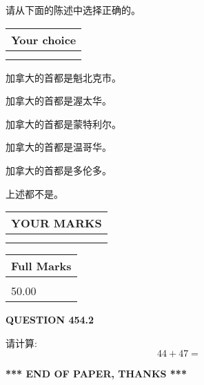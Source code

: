 \documentclass{ctexart}
\begin{document}
  
请从下面的陈述中选择正确的。
  
  
\noindent\hspace{3.0in} \begin{tabular}{|l|}
\hline
Your choice \\
\hline
 \\ 
 \\ 
\hline
\end{tabular}
  
  
 
 
加拿大的首都是魁北克市。
 
 
加拿大的首都是渥太华。
 
 
加拿大的首都是蒙特利尔。
 
 
加拿大的首都是温哥华。
 
 
加拿大的首都是多伦多。
 
 
 上述都不是。
 
 
  
\vspace{0.2in}
  
\noindent\begin{tabular}{|l|}
\hline
 YOUR MARKS  \\
\hline
 \\ 
 \\ 
\hline
\end{tabular}
\hspace{0.05in} \begin{tabular}{|l|}
\hline
 Full Marks  \\
\hline
 \\ 
50.00 \\
\hline
\end{tabular}
{\textbf{\Large{QUESTION
454.2 
}}}
  
  
 
请计算:
\begin{equation}
44 +  %
47 = \nonumber
\end{equation}
 

 

 
   
   
 \vspace{0.2in}
 
   
   
   
   
\vspace{1.0in} 
{\textbf{\large{ *** END OF PAPER, THANKS *** }}} 
   
\end{document}
